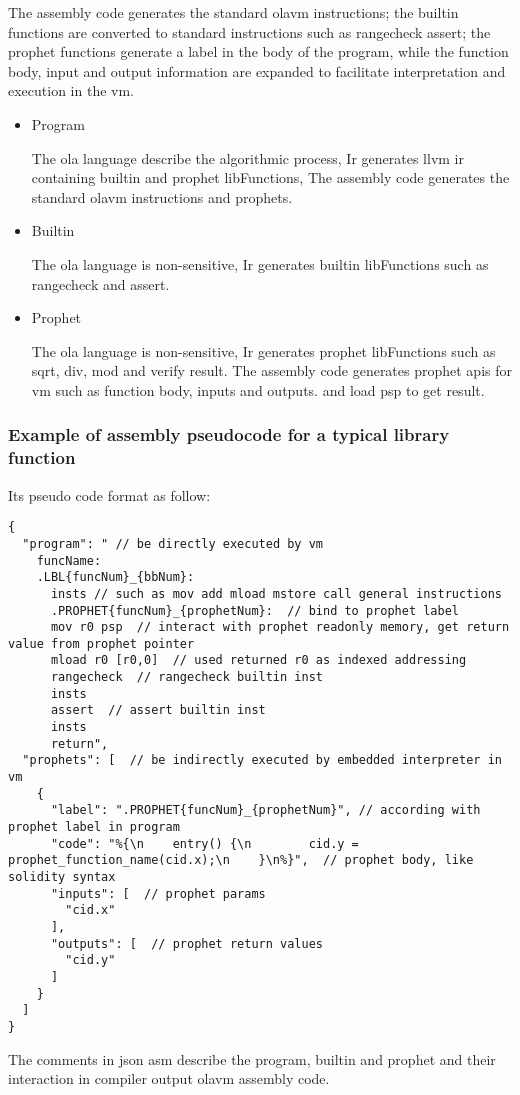     The assembly code generates the standard olavm instructions; the builtin functions are converted to standard instructions such as rangecheck assert;
the prophet functions generate a label in the body of the program, while the function body, input and output information are expanded to facilitate interpretation and execution in the vm.
\begin{itemize}
    \item Program

    The ola language describe the algorithmic process, Ir generates llvm ir containing builtin and prophet libFunctions, The assembly code generates the standard olavm instructions and prophets.
    \item Builtin

    The ola language is non-sensitive, Ir generates builtin libFunctions such as rangecheck and assert.
    \item Prophet

    The ola language is non-sensitive, Ir generates prophet libFunctions such as sqrt, div, mod and verify result.
The assembly code generates prophet apis for vm such as function body, inputs and outputs. and load psp to get result.
\end{itemize}

\subsubsection*{Example of assembly pseudocode for a typical library function}

Its pseudo code format as follow:
\begin{lstlisting}[language={}]
{
  "program": " // be directly executed by vm
    funcName:
    .LBL{funcNum}_{bbNum}:
      insts // such as mov add mload mstore call general instructions
      .PROPHET{funcNum}_{prophetNum}:  // bind to prophet label
      mov r0 psp  // interact with prophet readonly memory, get return value from prophet pointer
      mload r0 [r0,0]  // used returned r0 as indexed addressing
      rangecheck  // rangecheck builtin inst
      insts
      assert  // assert builtin inst
      insts
      return",
  "prophets": [  // be indirectly executed by embedded interpreter in vm
    {
      "label": ".PROPHET{funcNum}_{prophetNum}", // according with prophet label in program
      "code": "%{\n    entry() {\n        cid.y = prophet_function_name(cid.x);\n    }\n%}",  // prophet body, like solidity syntax
      "inputs": [  // prophet params
        "cid.x"
      ],
      "outputs": [  // prophet return values
        "cid.y"
      ]
    }
  ]
}
\end{lstlisting}
The comments in json asm describe the program, builtin and prophet and their interaction in compiler output olavm assembly code.

